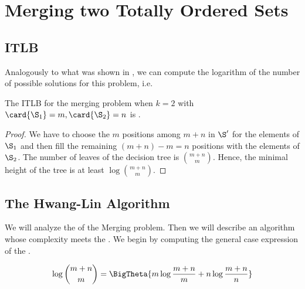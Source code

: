 \section{Merging two Totally Ordered Sets}
\label{tree:merging:k=2}

\subsection*{ITLB}
\label{tree:merging:k=2:ITLB}

Analogously to what was shown in , we can compute the
logarithm of the number of possible solutions for this problem, i.e.

\begin{theorem}
The ITLB for the merging problem when \(k = 2\) with \(\card{\S_1} = m, \card{\S_2}
= n\) is .
\end{theorem}

\begin{proof}
We have to choose the $m$ positions among $m+n$ in $\S'$ for the elements of
$\S_1$ and then fill the remaining $(m+n) - m = n$ positions with the elements
of $\S_2$. The number of leaves of the decision tree is $\binom{m+n}{m}$.
Hence, the minimal height of the tree is at least $\log \binom{m+n}{m}$.
\end{proof}



\subsection*{The Hwang-Lin Algorithm}
\label{tree:merging:k=2:alg}

We will analyze the  of the Merging problem. Then we will
describe an algorithm whose complexity meets the . We begin by
computing the general case expression of the .

\begin{lemma}
\begin{align*}
\log\binom{m+n}{m} &= \BigTheta{m \log\frac{m+n}{m} + n \log\frac{m+n}{n}}\\
\end{align*}
\end{lemma}

